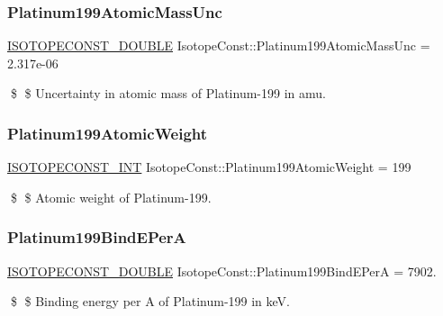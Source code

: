 \subsubsection{\texorpdfstring{Platinum199\+Atomic\+Mass\+Unc}{Platinum199AtomicMassUnc}}
{\footnotesize\ttfamily \mbox{\hyperlink{group___isotope_const-_macros_ga8f45a7272ce02c0b4c65c44636ed719a}{I\+S\+O\+T\+O\+P\+E\+C\+O\+N\+S\+T\+\_\+\+D\+O\+U\+B\+LE}} Isotope\+Const\+::\+Platinum199\+Atomic\+Mass\+Unc = 2.\+317e-\/06}

\$ \$ Uncertainty in atomic mass of Platinum-\/199 in amu. \mbox{\label{group___isotope_const-_platinum-_pt199_ga568897ba106076285399ae5b50e9b2cf}} 
\subsubsection{\texorpdfstring{Platinum199\+Atomic\+Weight}{Platinum199AtomicWeight}}
{\footnotesize\ttfamily \mbox{\hyperlink{group___isotope_const-_macros_ga5f18360b3e99483a35c32d789e62621c}{I\+S\+O\+T\+O\+P\+E\+C\+O\+N\+S\+T\+\_\+\+I\+NT}} Isotope\+Const\+::\+Platinum199\+Atomic\+Weight = 199}

\$ \$ Atomic weight of Platinum-\/199. \mbox{\label{group___isotope_const-_platinum-_pt199_ga351649824f258c47dd79bdf4bc26e79a}} 
\subsubsection{\texorpdfstring{Platinum199\+Bind\+E\+PerA}{Platinum199BindEPerA}}
{\footnotesize\ttfamily \mbox{\hyperlink{group___isotope_const-_macros_ga8f45a7272ce02c0b4c65c44636ed719a}{I\+S\+O\+T\+O\+P\+E\+C\+O\+N\+S\+T\+\_\+\+D\+O\+U\+B\+LE}} Isotope\+Const\+::\+Platinum199\+Bind\+E\+PerA = 7902.}

\$ \$ Binding energy per A of Platinum-\/199 in keV. \mbox{\label{group___isotope_const-_platinum-_pt199_gaddf746cc08a88dfd3f6f8cb3e5d19684}} 
